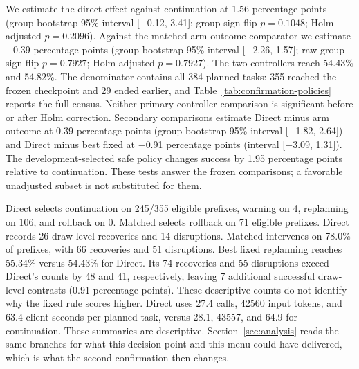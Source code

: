 We estimate the direct effect against continuation at 1.56 percentage points (group-bootstrap 95\% interval [$-$0.12, 3.41]; group sign-flip $p=0.1048$; Holm-adjusted $p=0.2096$). Against the matched arm-outcome comparator we estimate $-$0.39 percentage points (group-bootstrap 95\% interval [$-$2.26, 1.57]; raw group sign-flip $p=0.7927$; Holm-adjusted $p=0.7927$). The two controllers reach 54.43\% and 54.82\%. The denominator contains all 384 planned tasks: 355 reached the frozen checkpoint and 29 ended earlier, and Table~\ref{tab:confirmation-policies} reports the full census. Neither primary controller comparison is significant before or after Holm correction. Secondary comparisons estimate Direct minus arm outcome at 0.39 percentage points (group-bootstrap 95\% interval [$-$1.82, 2.64]) and Direct minus best fixed at $-$0.91 percentage points (interval [$-$3.09, 1.31]). The development-selected safe policy changes success by 1.95 percentage points relative to continuation. These tests answer the frozen comparisons; a favorable unadjusted subset is not substituted for them.

Direct selects continuation on 245/355 eligible prefixes, warning on 4, replanning on 106, and rollback on 0. Matched selects rollback on 71 eligible prefixes. Direct records 26 draw-level recoveries and 14 disruptions. Matched intervenes on 78.0\% of prefixes, with 66 recoveries and 51 disruptions. Best fixed replanning reaches 55.34\% versus 54.43\% for Direct. Its 74 recoveries and 55 disruptions exceed Direct's counts by 48 and 41, respectively, leaving 7 additional successful draw-level contrasts (0.91 percentage points). These descriptive counts do not identify why the fixed rule scores higher. Direct uses 27.4 calls, 42560 input tokens, and 63.4 client-seconds per planned task, versus 28.1, 43557, and 64.9 for continuation. These summaries are descriptive. Section~\ref{sec:analysis} reads the same branches for what this decision point and this menu could have delivered, which is what the second confirmation then changes.

